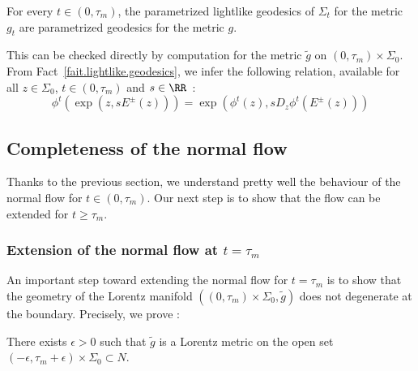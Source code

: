 \begin{fact}\label{fait.lightlike.geodesics}
For every $t \in (0,\tau_m)$, the parametrized lightlike geodesics of $\Sigma_t$ for the metric $g_t$ are parametrized geodesics for the metric $g$.
\end{fact}


This can be checked directly by computation for the metric $\tilde{g}$ on $(0,\tau_m) \times \Sigma_0$. From Fact~\ref{fait.lightlike.geodesics}, we infer the following relation, available for all $z \in \Sigma_0$, $t \in (0,\tau_m)$ and $s \in \RR$~:
\begin{equation}\label{eq.equivariance2}
\phi^t(\exp(z,sE^{\pm}(z)))=\exp(\phi^t(z),sD_z\phi^t(E^{\pm}(z)))
\end{equation}


\subsection{Completeness of the normal flow}
Thanks to the previous section, we understand pretty well the behaviour of the normal flow for $t \in (0,\tau_m)$. Our next step is to show that the flow can be extended for $t \geq \tau_m$.


\subsubsection{Extension of the normal flow at \texorpdfstring{$t=\tau_m$}{t= taum}} An important step toward extending the normal flow for $t=\tau_m$ is to show that the geometry of the Lorentz manifold $((0,\tau_m) \times \Sigma_0, \tilde{g})$ does not degenerate at the boundary. Precisely, we prove :

\begin{lemm}\label{lem.nondegeneracy}
There exists $\epsilon >0$ such that $\tilde{g}$ is a Lorentz metric on the open set $(- \epsilon, \tau_m+\epsilon) \times \Sigma_0 \subset N$.
\end{lemm}

